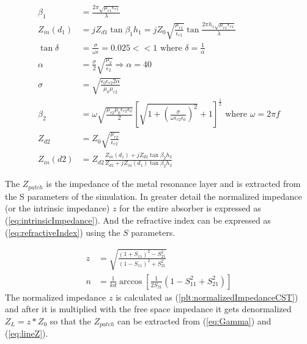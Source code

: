         \begin{subequations}
            \label{eq:Zin}
            \begin{align}
                \beta_1 & = \frac{2\pi\sqrt{\mu_{r1}\epsilon_{r1}}}{\lambda} \label{eq:beta_1} \\
                Z_{in}(d_1) & = jZ_{d1}\tan{\beta_1h_1} = jZ_0\sqrt{\frac{\mu_{r1}}{\epsilon_{r1}}}
                        \tan{\frac{2\pi h_1\sqrt{\mu_{r1}\epsilon_{r1}}}{\lambda}} \label{eq:Zin_d1} \\
                \tan{\delta} & = \frac{\sigma}{\omega\epsilon} = 0.025 << 1
                    \textrm{ where } \delta = \frac{1}{\alpha} \label{eq:lossTangent} \\
                \alpha & = \frac{\sigma}{2}\sqrt{\frac{\mu_2}{\epsilon_2}} \Rightarrow \alpha = 40 \label{eq:alpha} \\
                \sigma & = \sqrt{\frac{\epsilon_0\epsilon_{r2}2\alpha}{\mu_0\mu_{r2}}} \label{eq:sigma} \\
                \beta_2 & = \omega\sqrt{\frac{\mu_{r2}\mu_0\epsilon_{r2}\epsilon_0}{2}}
                    \left[
                        \sqrt{1+\left(\frac{\sigma}{\omega\epsilon_{r2}\epsilon_0}\right)^2}+1
                    \right]^\frac{1}{2} \textrm{ where } \omega = 2\pi f \label{eq:beta_2} \\
                Z_{d2} & = Z_0\sqrt{\frac{\mu_{r2}}{\epsilon_{r2}}} \label{eq:Zd2} \\
                Z_{in}(d2) & = Z_{d2}\frac{Z_{in}(d_1)+jZ_{d2}\tan{\beta_2h_2}}
                    {Z_{d2}+jZ_{in}(d_1)\tan{\beta_2h_2}} \label{eq:Zin_d2}
            \end{align} 
        \end{subequations}

        The $Z_{patch}$ is the impedance of the metal resonance layer and is 
        extracted from the S parameters of the simulation. In greater detail 
        the normalized impedance (or the intrinsic impedance) $z$ for the entire 
        absorber is expressed as (\ref{eq:intrinsicImpedance}). And the 
        refractive index can be expressed as (\ref{eq:refractiveIndex}) using
        the $S$ parameters.

        \begin{subequations}
            \label{eq:Impedance}
            \begin{align}
                z & = \sqrt{\frac{(1 + S_{11})^2 - S_{21}^2}{(1 - S_{11})^2 + S_{21}^2}} \label{eq:intrinsicImpedance} \\
                n & = \frac{1}{kd}\arccos{\left[\frac{1}{2S_{21}}(1-S_{11}^2+S_{21}^2)\right]} \label{eq:refractiveIndex}
            \end{align}
        \end{subequations}
        The normalized impedance $z$ is calculated as 
        (\ref{plt:normalizedImpedanceCST}) and after it is multiplied
        with the free space impedance it gets denormalized $Z_L = z*Z_0$ so
        that the $Z_{patch}$ can be extracted from (\ref{eq:Gamma}) and (\ref{eq:lineZ}).
        
